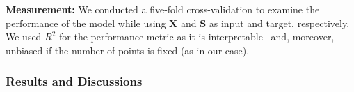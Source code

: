 \noindent \textbf{Measurement:}
We conducted a five-fold cross-validation to examine the performance of the model while using $\mathbf{X}$ and $\mathbf{S}$ as input and target, respectively. 
We used $R^2$ for the performance metric as it is interpretable~\cite{cameron97joe} and, moreover, unbiased if the number of points is fixed (as in our case).






\subsubsection{Results and Discussions}

